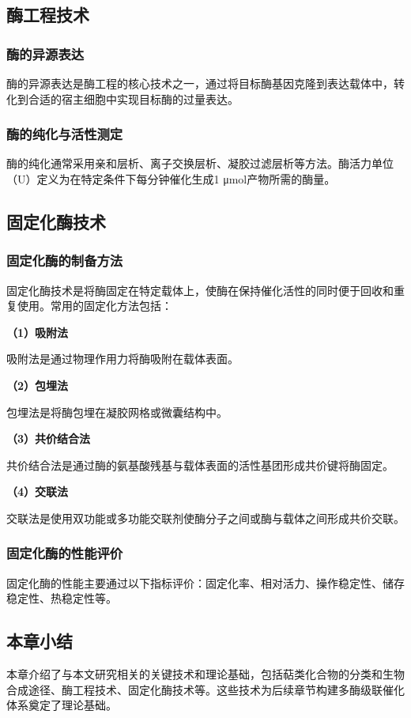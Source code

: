 \subsection{酶工程技术}

\subsubsection{酶的异源表达}


酶的异源表达是酶工程的核心技术之一，通过将目标酶基因克隆到表达载体中，转化到合适的宿主细胞中实现目标酶的过量表达。

\subsubsection{酶的纯化与活性测定}


酶的纯化通常采用亲和层析、离子交换层析、凝胶过滤层析等方法。酶活力单位（U）定义为在特定条件下每分钟催化生成1 μmol产物所需的酶量。

\subsection{固定化酶技术}

\subsubsection{固定化酶的制备方法}


固定化酶技术是将酶固定在特定载体上，使酶在保持催化活性的同时便于回收和重复使用。常用的固定化方法包括：

\textbf{（1）吸附法}

吸附法是通过物理作用力将酶吸附在载体表面。

\textbf{（2）包埋法}

包埋法是将酶包埋在凝胶网格或微囊结构中。

\textbf{（3）共价结合法}

共价结合法是通过酶的氨基酸残基与载体表面的活性基团形成共价键将酶固定。

\textbf{（4）交联法}

交联法是使用双功能或多功能交联剂使酶分子之间或酶与载体之间形成共价交联。

\subsubsection{固定化酶的性能评价}


固定化酶的性能主要通过以下指标评价：固定化率、相对活力、操作稳定性、储存稳定性、热稳定性等。

\subsection{本章小结}


本章介绍了与本文研究相关的关键技术和理论基础，包括萜类化合物的分类和生物合成途径、酶工程技术、固定化酶技术等。这些技术为后续章节构建多酶级联催化体系奠定了理论基础。
